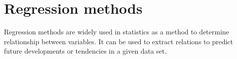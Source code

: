 \section{Regression methods} \label{sec:regressionMethods}

	

Regression methods are widely used in statistics as a method to determine relationship between variables. It can be used to extract relations to predict future developments or tendencies in a given data set. 

%
%
%


